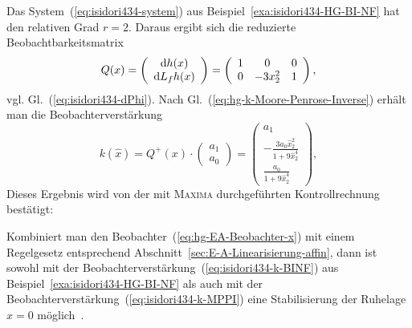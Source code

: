 \begin{example}
\label{exa:isidori434-HG-MPPI}Das System~(\ref{eq:isidori434-system})
aus Beispiel~\ref{exa:isidori434-HG-BI-NF} hat den relativen Grad
$r=2$. Daraus ergibt sich die reduzierte Beobachtbarkeitsmatrix 
\[
Q(x)=\left(\begin{array}{c}
{\mathrm{d}} h(x)\\
{\mathrm{d}} L_{f}h(x)
\end{array}\right)=\left(\begin{array}{ccc}
1 & 0 & 0\\
0 & -3x_{2}^{2} & 1
\end{array}\right),
\]
vgl. Gl.~(\ref{eq:isidori434-dPhi}). Nach Gl.~(\ref{eq:hg-k-Moore-Penrose-Inverse})
erhält man die Beobachterverstärkung 
\begin{equation}
k(\hat{x})=Q^{+}(x)\cdot\left(\begin{array}{c}
a_{1}\\
a_{0}
\end{array}\right)=\left(\begin{array}{c}
a_{1}\\
-\frac{3a_{0}\hat{x}_{2}^{2}}{1+9\hat{x}_{2}^{4}}\\
\frac{a_{0}}{1+9\hat{x}_{2}^{4}}
\end{array}\right),\label{eq:isidori434-k-MPPI}
\end{equation}
Dieses Ergebnis wird von der mit \textsc{Maxima} durchgeführten Kontrollrechnung
bestätigt:

\begin{maxima}\end{maxima}

Kombiniert man den Beobachter~(\ref{eq:hg-EA-Beobachter-x}) mit
einem Regelgesetz entsprechend Abschnitt~\ref{sec:E-A-Linearisierung-affin},
dann ist sowohl mit der Beobachterverstärkung~(\ref{eq:isidori434-k-BINF})
aus Beispiel~\ref{exa:isidori434-HG-BI-NF} als auch mit der Beobachterverstärkung~(\ref{eq:isidori434-k-MPPI})
eine Stabilisierung der Ruhelage $x=0$ möglich~\cite{roebenack2004at}.
\end{example}

